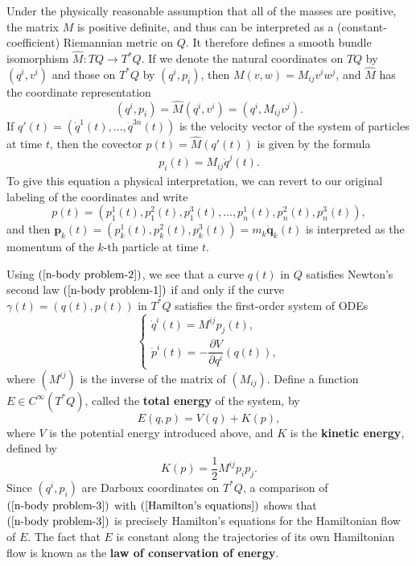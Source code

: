 \begin{example}
Under the physically reasonable assumption that all of the masses are positive, the matrix $M$ is positive definite, and thus can be interpreted as a (constant-coefficient) Riemannian metric on $Q$. It therefore defines a smooth bundle isomorphism $\widehat{M}:TQ\to T^*Q$. If we denote the natural coordinates on $TQ$ by $(q^i,v^i)$ and those on $T^*Q$ by $(q^i,p_i)$, then $M(v,w)=M_{ij}v^iw^j$, and $\widehat{M}$ has the coordinate representation
\[(q^i,p_i)=\widehat{M}(q^i,v^i)=(q^i,M_{ij}v^j).\]
If $q'(t)=(\dot{q}^1(t),\dots,\dot{q}^{3n}(t))$ is the velocity vector of the system of particles at time $t$, then the covector $p(t)=\widehat{M}(q'(t))$ is given by the formula
\begin{align}\label{n-body problem-2}
p_i(t)=M_{ij}\dot{q}^j(t).
\end{align}
To give this equation a physical interpretation, we can revert to our original labeling of the coordinates and write
\[p(t)=(p_1^1(t),p_1^2(t),p_1^3(t),\dots,p_n^1(t),p_n^2(t),p_n^3(t)),\]
and then $\mathbf{p}_k(t)=(p_k^1(t),p_k^2(t),p_k^3(t))=m_k\dot{\mathbf{q}}_k(t)$ is interpreted as the momentum of the $k$-th particle at time $t$.\par
Using $(\ref{n-body problem-2})$, we see that a curve $q(t)$ in $Q$ satisfies Newton's second law $(\ref{n-body problem-1})$ if and only if the curve $\gamma(t)=(q(t),p(t))$ in $T^*Q$ satisfies the first-order system of ODEs
\begin{equation}\label{n-body problem-3}
\left\{
\begin{array}{l}
\dot{q}^i(t)=M^{ij}p_j(t),\\[8pt]
\dot{p}^i(t)=-\dfrac{\partial V}{\partial q^i}(q(t)),
\end{array}
\right.
\end{equation}
where $(M^{ij})$ is the inverse of the matrix of $(M_{ij})$. Define a function $E\in C^\infty(T^*Q)$, called the \textbf{total energy} of the system, by
\[E(q,p)=V(q)+K(p),\]
where $V$ is the potential energy introduced above, and $K$ is the \textbf{kinetic energy}, defined by
\[K(p)=\frac{1}{2}M^{ij}p_ip_j.\]
Since $(q^i,p_i)$ are Darboux coordinates on $T^*Q$, a comparison of $(\ref{n-body problem-3})$ with $(\ref{Hamilton's equations})$ shows that $(\ref{n-body problem-3})$ is precisely Hamilton's equations for the Hamiltonian flow of $E$. The fact that $E$ is constant along the trajectories of its own Hamiltonian flow is known as the \textbf{law of conservation of energy}.
\end{example}

